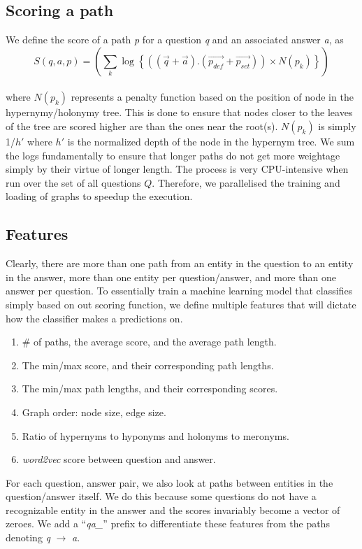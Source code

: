 \subsection{Scoring a path}
We define the score of a path \emph{p} for a question \emph{q} and an associated answer \emph{a},
as $$S(q, a, p) = \left(\sum_{k}\log\left\{((\vec{q}+\vec{a}).(\vec{p_{def}}+\vec{p_{set}}))\times N(p_k)\right\}\right)$$\\
where $N(p_k)$ represents a penalty function based on the position of node in the hypernymy/holonymy tree.
This is done to ensure that nodes closer to the leaves of the tree are scored higher are than the ones
near the root(s). $N(p_k)$ is simply 1/$h'$ where $h'$ is the normalized depth of the node in the hypernym tree.
We sum the logs fundamentally to ensure that longer paths do not get more weightage simply by their
virtue of longer length. The process is very CPU-intensive when run over the set of all questions $Q$. Therefore,
we parallelised the training and loading of graphs to speedup the execution.


\subsection{Features}
Clearly, there are more than one path from an entity in the question to an entity in the answer,
more than one entity per question/answer, and more than one answer per question. To essentially
train a machine learning model that classifies simply based on out scoring function, we define
multiple features that will dictate how the classifier makes a predictions on. 

\begin{enumerate}
\item \# of paths, the average score, and the average path length.
\item The min/max score, and their corresponding path lengths.
\item The min/max path lengths, and their corresponding scores.
\item Graph order: node size, edge size.
\item Ratio of hypernyms to hyponyms and holonyms to meronyms.
\item \emph{word2vec} score between question and answer.
\end{enumerate}

For each question, answer pair, we also look at paths between entities in the question/answer itself.
We do this because some questions do not have a recognizable entity in the answer and the scores
invariably become a vector of zeroes. We add a ``\emph{qa\_}'' prefix to differentiate these
features from the paths denoting \emph{q} $\rightarrow$ \emph{a}.

